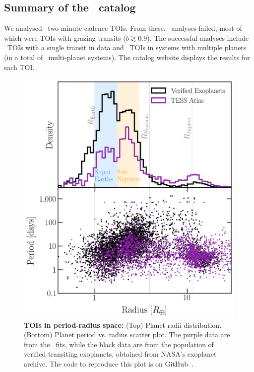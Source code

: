 \documentclass[floatfix,ApJL,twocolumn]{aastex631}
\begin{document}
\subsection{Summary of the \tessAtlas\ catalog}

We analysed \numAnalysed\ two-minute cadence TOIs. 
From these, \failPercent\ analyses failed, most of which were TOIs with grazing transits ($b\gtrsim0.9$). 
The successful analyses include \numAnalysedSingle\ TOIs with a single transit in data and \numAnalysedMulti\ TOIs in systems with multiple planets (in a total of \numMultiSystems\ multi-planet systems). 
The catalog website displays the results for each TOI. 

\begin{figure}
  \includegraphics[width=\linewidth]{figures/radius_period_plot.png}
  \caption{\textbf{TOIs in period-radius space:}
    (Top) Planet radii distribution. (Bottom) Planet period vs. radius scatter plot. 
    The purple data are from the \tessAtlas\ fits, while the black data are from the population of verified transiting exoplanets, obtained from NASA's exoplanet archive.
    The code to reproduce this plot is on GitHub~\paperPlotsLink.
  }
  \label{fig:radiusHist}
\end{figure}
\end{document}
